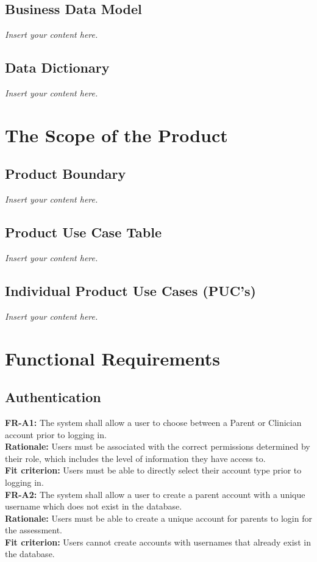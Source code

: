 \documentclass[12pt]{article}
\newcommand{\lips}{\textit{Insert your content here.}}
\begin{document}
\subsection{Business Data Model}
\lips
\subsection{Data Dictionary}
\lips

\section{The Scope of the Product}
\subsection{Product Boundary}
\lips
\subsection{Product Use Case Table}
\lips
\subsection{Individual Product Use Cases (PUC's)}
\lips


\section{Functional Requirements}

\subsection{Authentication}
\textbf{FR-A1: }The system shall allow a user to choose between a Parent or Clinician account prior to logging in.\\
\textbf{Rationale: }Users must be associated with the correct permissions determined by their role, which includes the level of information they have access to.\\
\textbf{Fit criterion: }Users must be able to directly select their account type prior to logging in.\\

\textbf{FR-A2: }The system shall allow a user to create a parent account with a unique username which does not exist in the database.\\
\textbf{Rationale: }Users must be able to create a unique account for parents to login for the assessment.\\
\textbf{Fit criterion: }Users cannot create accounts with usernames that already exist in the database.\\
\end{document}
